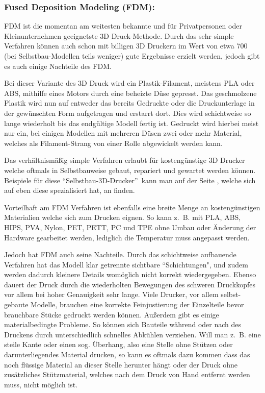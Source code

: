 \subsubsection{Fused Deposition Modeling (FDM):}

FDM ist die momentan am weitesten bekannte und für Privatpersonen oder Kleinunternehmen geeignetste 3D Druck-Methode. Durch das sehr simple Verfahren können auch schon mit billigen 3D Druckern im Wert von etwa 700 ~ (bei Selbstbau-Modellen teils weniger) gute Ergebnisse erzielt werden, jedoch gibt es auch einige Nachteile des FDM.

Bei dieser Variante des 3D Druck wird ein Plastik-Filament, meistens PLA oder ABS, mithilfe eines Motors durch eine beheizte Düse gepresst. Das geschmolzene Plastik wird nun auf entweder das bereits Gedruckte oder die Druckunterlage in der gewünschten Form aufgetragen und erstarrt dort.
Dies wird schichtweise so lange wiederholt bis das endgültige Modell fertig ist. Gedruckt wird hierbei meist nur ein, bei einigen Modellen mit mehreren Düsen zwei oder mehr Material, welches als Filament-Strang von einer Rolle abgewickelt werden kann.

Das verhältnismäßig simple Verfahren erlaubt für kostengünstige 3D Drucker welche oftmals in Selbstbauweise gebaut, repariert und gewartet werden können. Beispiele für diese \textquotedblleft Selbstbau-3D-Drucker\textquotedblright~kann man auf der Seite , welche sich auf eben diese spezialisiert hat, an finden.

Vorteilhaft am FDM Verfahren ist ebenfalls eine breite Menge an kostengünstigen Materialien welche sich zum Drucken eignen. So kann z.~B. mit PLA, ABS, HIPS, PVA, Nylon, PET, PETT, PC und TPE \parencite{MATERIALS} ohne Umbau oder Änderung der Hardware gearbeitet werden, lediglich die Temperatur muss angepasst werden.

Jedoch hat FDM auch seine Nachteile.
Durch das schichtweise aufbauende Verfahren hat das Modell klar getrennte sichtbare \textquotedblleft Schichtungen", und zudem werden dadurch kleinere Details womöglich nicht korrekt wiedergegeben. Ebenso dauert der Druck durch die wiederholten Bewegungen des schweren Druckkopfes vor allem bei hoher Genauigkeit sehr lange. Viele Drucker, vor allem selbst-gebaute Modelle, brauchen eine korrekte Feinjustierung der Einzelteile bevor brauchbare Stücke gedruckt werden können. Außerdem gibt es einige materialbedingte Probleme. So können sich Bauteile während oder nach des Druckens durch unterschiedlich schnelles Abkühlen verziehen. Will man z.~B. eine steile Kante oder einen sog. Überhang, also eine Stelle ohne Stützen oder darunterliegendes Material drucken, so kann es oftmals dazu kommen dass das noch flüssige Material an dieser Stelle herunter hängt oder der Druck ohne zusätzliches Stützmaterial, welches nach dem Druck von Hand entfernt werden muss, nicht möglich ist. \parencite[Informationen aus:][]{FDMDetail,DRUCKVERFAHREN}